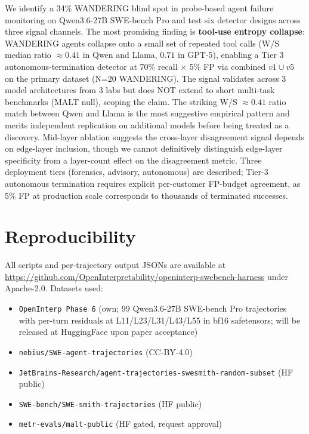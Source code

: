 \documentclass[11pt]{article}
\begin{document}
We identify a 34\% WANDERING blind spot in probe-based agent failure monitoring on Qwen3.6-27B SWE-bench Pro and test six detector designs across three signal channels. The most promising finding is \textbf{tool-use entropy collapse}: WANDERING agents collapse onto a small set of repeated tool calls (W/S median ratio $\approx 0.41$ in Qwen and Llama, $0.71$ in GPT-5), enabling a Tier 3 autonomous-termination detector at 70\% recall $\times$ 5\% FP via combined $v1 \cup v5$ on the primary dataset (N=20 WANDERING). The signal validates across 3 model architectures from 3 labs but does NOT extend to short multi-task benchmarks (MALT null), scoping the claim. The striking W/S $\approx 0.41$ ratio match between Qwen and Llama is the most suggestive empirical pattern and merits independent replication on additional models before being treated as a discovery. Mid-layer ablation suggests the cross-layer disagreement signal depends on edge-layer inclusion, though we cannot definitively distinguish edge-layer specificity from a layer-count effect on the disagreement metric. Three deployment tiers (forensics, advisory, autonomous) are described; Tier-3 autonomous termination requires explicit per-customer FP-budget agreement, as 5\% FP at production scale corresponds to thousands of terminated successes.

\section*{Reproducibility}

All scripts and per-trajectory output JSONs are available at \url{https://github.com/OpenInterpretability/openinterp-swebench-harness} under Apache-2.0. Datasets used:
\begin{itemize}
\item \texttt{OpenInterp Phase 6} (own; 99 Qwen3.6-27B SWE-bench Pro trajectories with per-turn residuals at L11/L23/L31/L43/L55 in bf16 safetensors; will be released at HuggingFace upon paper acceptance)
\item \texttt{nebius/SWE-agent-trajectories} (CC-BY-4.0)
\item \texttt{JetBrains-Research/}\allowbreak\texttt{agent-trajectories-swesmith-random-subset} (HF public)
\item \texttt{SWE-bench/SWE-smith-trajectories} (HF public)
\item \texttt{metr-evals/malt-public} (HF gated, request approval)
\end{itemize}
\end{document}
